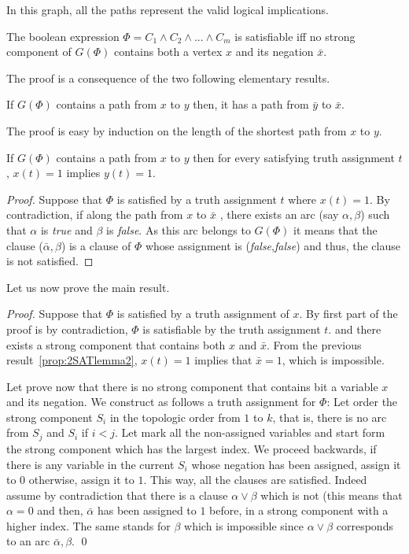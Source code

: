 In this graph, all the paths represent the valid logical implications. 

\begin{prop}
\label{prop:2SAT}
The boolean expression $\Phi = C_1 \wedge C_2 \wedge ... \wedge C_m$
is satisfiable iff no strong component of $G(\Phi)$ contains both a
vertex $x$ and its negation $\bar{x}$.
\end{prop}

The proof is a consequence of the two following elementary results.

\begin{prop}
\label{prop:2SATlemma1}
If $G(\Phi)$ contains a path from $x$ to $y$ then, it has a path from
$\bar{y}$ to $\bar{x}$.
\end{prop}

The proof is easy by induction on the length of the shortest path from $x$ to $y$. 


\begin{prop}
\label{prop:2SATlemma2}
If $G(\Phi)$ contains a path from $x$ to $y$ then for every satisfying
truth assignment $t$, $x(t)=1$ implies $y(t)=1$.
\end{prop}

\begin{proof}
Suppose that $\Phi$ is satisfied by a truth assignment $t$ where
$x(t)=1$.  By contradiction, if along the path from $x$ to $\bar{x}$ ,
there exists an arc (say $\alpha,\beta$) such that $\alpha$ is {\em
  true} and $\beta$ is {\em false}.  As this arc belongs to $G(\Phi)$
it means that the clause ($\bar{\alpha},\beta$) is a clause of $\Phi$
whose assignment is ({\em false},{\em false}) and thus, the clause is
not satisfied.
\end{proof}
\medskip

Let us now prove the main result.

\begin{proof}
Suppose that $\Phi$ is satisfied by a truth assignment of $x$.  By
first part of the proof is by contradiction, $\Phi$ is satisfiable by
the truth assignment $t$.  and there exists a strong component that
contains both $x$ and $\bar{x}$.  From the previous
result~\ref{prop:2SATlemma2}, $x(t)=1$ implies that $\bar{x}=1$, which
is impossible.

Let prove now that there is no strong component that contains bit a
variable $x$ and its negation.  We construct as follows a truth
assignment for $\Phi$: Let order the strong component $S_i$ in the
topologic order from $1$ to $k$, that is, there is no arc from $S_j$
and $S_i$ if $i<j$.  Let mark all the non-assigned variables and start
form the strong component which has the largest index.  We proceed
backwards, if there is any variable in the current $S_i$ whose
negation has been assigned, assign it to $0$ otherwise, assign it to
$1$.  This way, all the clauses are satisfied.  Indeed assume by
contradiction that there is a clause $\alpha \vee \beta$ which is not
(this means that $\alpha = 0$ and then, $\bar{\alpha}$ has been
assigned to $1$ before, in a strong component with a higher index.
The same stands for $\beta$ which is impossible since $\alpha \vee
\beta$ corresponds to an arc $\bar{\alpha},\beta$.  \qed
\end{proof}


